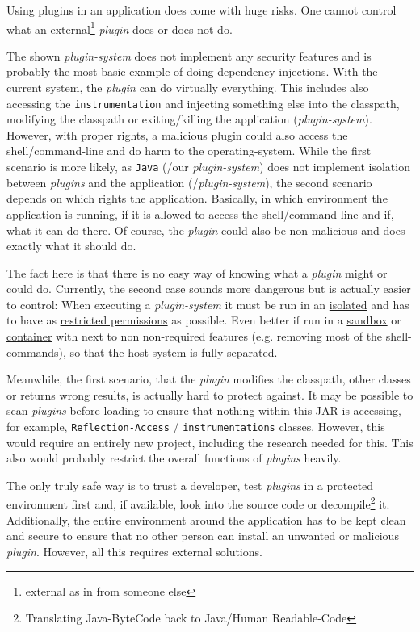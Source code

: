 Using plugins in an application does come with huge risks.
One cannot control what an external\footnote{external as in from someone else} \textit{plugin} does or does not do.

The shown \textit{plugin-system} does not implement any security features and is probably the most basic example of doing dependency injections.
With the current system, the \textit{plugin} can do virtually everything.
This includes also accessing the \lstinline{instrumentation} and injecting something else into the classpath, modifying the classpath or exiting/killing the application (\textit{plugin-system}).
However, with proper rights, a malicious plugin could also access the shell/command-line and do harm to the operating-system.
While the first scenario is more likely, as \texttt{Java} (/our \textit{plugin-system}) does not implement isolation between \textit{plugins} and the application (/\textit{plugin-system}), the second scenario depends on which rights the application.
Basically, in which environment the application is running, if it is allowed to access the shell/command-line and if, what it can do there.
Of course, the \textit{plugin} could also be non-malicious and does exactly what it should do.

The fact here is that there is no easy way of knowing what a \textit{plugin} might or could do.
Currently, the second case sounds more dangerous but is actually easier to control: 
When executing a \textit{plugin-system} it must be run in an \underline{isolated} and has to have as \underline{restricted permissions} as possible.
Even better if run in a \underline{sandbox} or \underline{container} with next to non non-required features (e.g. removing most of the shell-commands), so that the host-system is fully separated.

Meanwhile, the first scenario, that the \textit{plugin} modifies the classpath, other classes or returns wrong results, is actually hard to protect against.
It may be possible to scan \textit{plugins} before loading to ensure that nothing within this JAR is accessing, for example, \texttt{Reflection-Access} / \lstinline{instrumentations} classes.
However, this would require an entirely new project, including the research needed for this.
This also would probably restrict the overall functions of \textit{plugins} heavily.

The only truly safe way is to trust a developer, test \textit{plugins} in a protected environment first and, if available, look into the source code or decompile\footnote{Translating Java-ByteCode back to Java/Human Readable-Code} it.
Additionally, the entire environment around the application has to be kept clean and secure to ensure that no other person can install an unwanted or malicious \textit{plugin}.
However, all this requires external solutions.